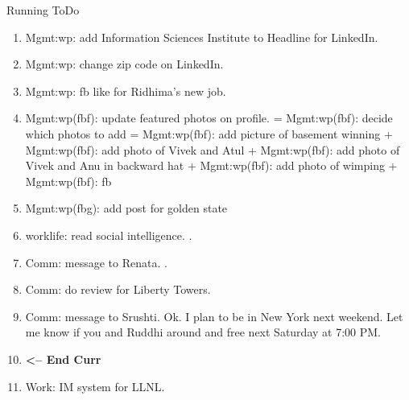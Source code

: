 \begin{multicols}{4}
\begin{columns}
\begin{column}{0.6\linewidth}
\begin{block}{Running ToDo}
\begin{enumerate}
      \item \tiny Mgmt:wp: add Information Sciences Institute to
        Headline for LinkedIn.   
      \item \tiny Mgmt:wp: change zip code on LinkedIn.  
      \item \tiny Mgmt:wp: fb like for Ridhima's new job.  

      \item \tiny Mgmt:wp(fbf): update featured photos on profile. =
        Mgmt:wp(fbf): decide which photos to add = Mgmt:wp(fbf): add picture of
        basement winning + Mgmt:wp(fbf): add photo of Vivek and Atul +
        Mgmt:wp(fbf): add photo of Vivek and Anu in backward hat + Mgmt:wp(fbf):
        add photo of wimping + Mgmt:wp(fbf): fb 

        \item \tiny Mgmt:wp(fbg): add post for golden state 
       
      \item \tiny worklife: read social intelligence. . 
        
      \item \tiny Comm: message to Renata. . 
      \item \tiny Comm: do review for Liberty Towers. 
      \item \tiny Comm: message to Srushti.
        Ok. I plan to be in New York next weekend. Let me know if you and
        Ruddhi around and free next Saturday at 7:00 PM. 

      \item \tiny \textbf{ <-- End Curr } 
        
      \item \tiny Work: IM system for LLNL.
        \end{enumerate}
      \end{block}
      

\end{column}
\end{columns}
\end{multicols}

